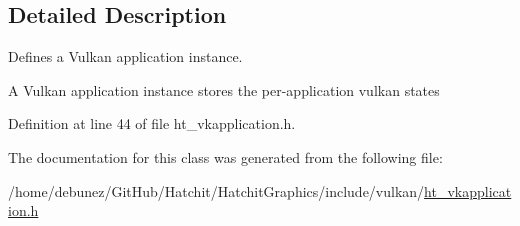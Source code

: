 \subsection{Detailed Description}
Defines a Vulkan application instance. 

A Vulkan application instance stores the per-\/application vulkan states 

Definition at line 44 of file ht\+\_\+vkapplication.\+h.



The documentation for this class was generated from the following file\+:\begin{DoxyCompactItemize}
\item 
/home/debunez/\+Git\+Hub/\+Hatchit/\+Hatchit\+Graphics/include/vulkan/\hyperlink{ht__vkapplication_8h}{ht\+\_\+vkapplication.\+h}\end{DoxyCompactItemize}

